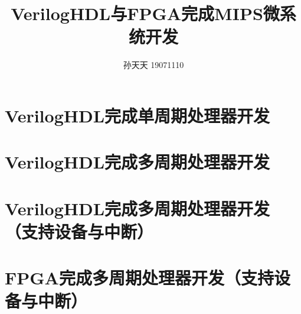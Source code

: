 \documentclass[scheme = chinese]{ctexart}
\begin{document}
\title{VerilogHDL与FPGA完成MIPS微系统开发}
\author{孙天天 19071110}


\tableofcontents
\clearpage

\maketitle


\part{VerilogHDL完成单周期处理器开发}
\setcounter{section}{0}

\clearpage

\clearpage

\clearpage

\part{VerilogHDL完成多周期处理器开发}
\setcounter{section}{0}

\clearpage

\clearpage

\clearpage

\part{VerilogHDL完成多周期处理器开发（支持设备与中断）}
\setcounter{section}{0}

\clearpage

\clearpage

\clearpage

\part{FPGA完成多周期处理器开发（支持设备与中断）}
\setcounter{section}{0}

\clearpage

\clearpage
\end{document}
